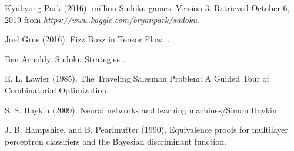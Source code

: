 \documentclass[twoside]{article}
\begin{document}
\begin{thebibliography}{99} %

Kyubyong Park (2016).
 million Sudoku games, Version 3. 
\newblock Retrieved October 6, 2019 from {\em https://www.kaggle.com/bryanpark/sudoku}.

Joel Grus (2016).
\newblock Fizz Buzz in Tensor Flow.
.

Ben Arnoldy.
\newblock Sudoku Strategies
.

E. L. Lawler (1985).
\newblock   The Traveling Salesman Problem: A Guided Tour of Combinatorial Optimization.

 S. S. Haykin (2009).
\newblock   Neural networks and learning machines/Simon Haykin.

J. B. Hampshire, and B. Pearlmutter (1990).
\newblock   Equivalence proofs for multilayer perceptron classifiers and the Bayesian discriminant function.
\end{thebibliography}

\end{document}
